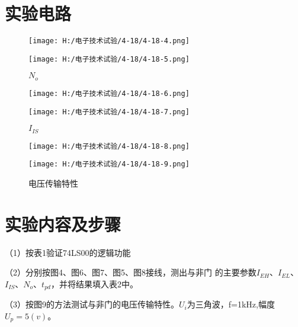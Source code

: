 \documentclass{article}
\begin{document}
\section{ 实验电路}
\begin{figure}[h]
	\begin{minipage}[t]{0.5\linewidth} %
	  \centering   
	  \texttt{[image: H:/电子技术试验/4-18/4-18-4.png]}   
	  \caption{$I_{EH}$}   
	  \label{fig:side:a}   
	\end{minipage}%
	\begin{minipage}[t]{0.5\linewidth}   
	  \centering   
	  \texttt{[image: H:/电子技术试验/4-18/4-18-5.png]}   
	  \caption{$N_o$}   
	  \label{fig:side:b}   
	\end{minipage}   
  \end{figure}
  \begin{figure}[h]
	\begin{minipage}[t]{0.5\linewidth} %
	  \centering   
	  \texttt{[image: H:/电子技术试验/4-18/4-18-6.png]}   
	  \caption{$I_{EL}$}   
	  \label{fig:side:a}   
	\end{minipage}%
	\begin{minipage}[t]{0.5\linewidth}   
	  \centering   
	  \texttt{[image: H:/电子技术试验/4-18/4-18-7.png]}   
	  \caption{$I_{IS}$}   
	  \label{fig:side:b}   
	\end{minipage}   
  \end{figure}
  \begin{figure}[h]
	\begin{minipage}[t]{0.5\linewidth} %
	  \centering   
	  \texttt{[image: H:/电子技术试验/4-18/4-18-8.png]}   
	  \caption{$t_{pd}$}   
	  \label{fig:side:a}   
	\end{minipage}%
	\begin{minipage}[t]{0.5\linewidth}   
	  \centering   
	  \texttt{[image: H:/电子技术试验/4-18/4-18-9.png]}   
	  \caption{电压传输特性}   
	  \label{fig:side:b}   
	\end{minipage}   
  \end{figure}


  \newpage
\section{ 实验内容及步骤}
（1）按表1验证74LS00的逻辑功能\par
（2）分别按图4、图6、图7、图5、图8接线，测出与非门      
的主要参数$I_{EH}$、$I_{EL}$、$I_{IS}$、$N_o$、$t_{pd}$，并将结果填入表2中。\par
（3）按图9的方法测试与非门的电压传输特性。$U_i$为三角波，f=1kHz,幅度
$U_p=5(v)$。\par
 
\end{document}
